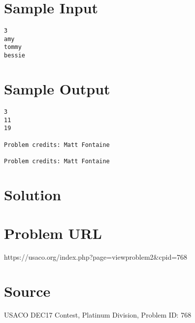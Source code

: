 \documentclass[12pt]{article}
\begin{document}
\section*{Sample Input}
\begin{verbatim}
3
amy
tommy
bessie
\end{verbatim}

\section*{Sample Output}
\begin{verbatim}
3
11
19

Problem credits: Matt Fontaine

Problem credits: Matt Fontaine
\end{verbatim}

\section*{Solution}


\section*{Problem URL}
https://usaco.org/index.php?page=viewproblem2&cpid=768

\section*{Source}
USACO DEC17 Contest, Platinum Division, Problem ID: 768
\end{document}
